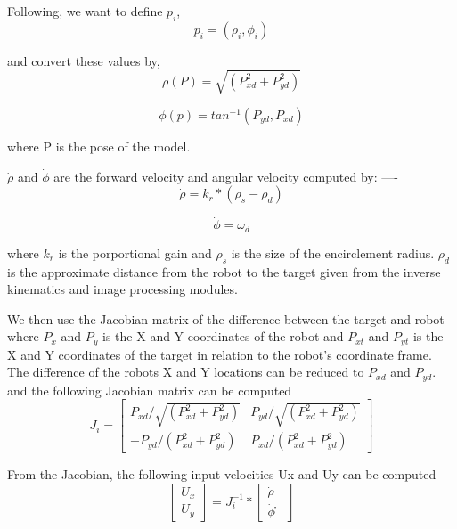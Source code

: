 \documentclass[conference]{IEEEtran}
\begin{document}
Following, we want to define $p_i$,
\begin{equation}
	p_i= (\rho_i , \phi_i)
\end{equation}
	
and convert these values by,
\begin{equation}
	\rho(P)= \sqrt{(P_{xd}^2+P_{yd}^2 ) }
\end{equation}
	
\begin{equation}
	\phi(p)= tan^{-1} ⁡(P_{yd},P_{xd})
\end{equation}
	

where P is the pose of the model.

$\dot{\rho}$ and $\dot{\phi}$ are the forward velocity and angular velocity computed by:
----
\begin{equation}
	\dot{\rho}=k_r*(\rho_s- \rho_d)
\end{equation}
		
\begin{equation}
	\dot{\phi}=\omega_d
\end{equation}
	

where $k_r$  is the porportional gain and $\rho_s$ is the size of the encirclement radius. $\rho_d$ is the approximate distance from the robot to the target given from the inverse kinematics and image processing modules.

We then use the Jacobian matrix of the difference between the target and robot where $P_x$ and $P_y$ is the X and Y coordinates of the robot and $P_{xt}$ and $P_{yt}$ is the X and Y coordinates of the target in relation to the robot’s coordinate frame. The difference of the robots X and Y locations can be reduced to $P_{xd}$ and $P_{yd}$. and the following Jacobian  matrix can be computed
\begin{equation}
	J_i =
\begin{bmatrix}
    P_{xd}/\sqrt{(P_{xd}^2+P_{yd}^2 )}      &   P_{yd}/\sqrt{(P_{xd}^2+P_{yd}^2 )}  \\
   -P_{yd}/(P_{xd}^2+P_{yd}^2 )      &  P_{xd}/(P_{xd}^2+P_{yd}^2)   
    
\end{bmatrix}
\end{equation}


	


From the Jacobian, the following input velocities Ux and Uy can be computed
\begin{equation}
		\begin{bmatrix}
		U_x\\U_y 
		\end{bmatrix}
		=J_i^{-1}*\begin{bmatrix}\dot\rho \\ \dot\phi ̇\end{bmatrix}
\end{equation}
	
\end{document}
